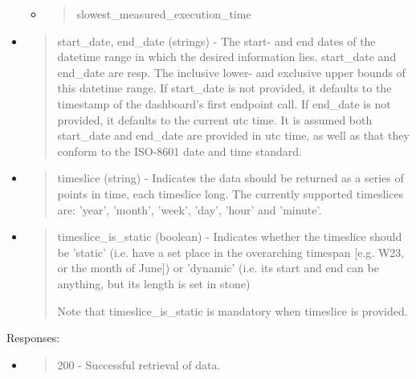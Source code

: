 \begin{itemize}
\begin{itemize}
\begin{quote}
    \end{quote}
  \item
    \begin{quote}
    slowest\_measured\_execution\_time
    \end{quote}
  \end{itemize}
\item
  \begin{quote}
  start\_date, end\_date (strings) - The start- and end dates of the
  datetime range in which the desired information lies. start\_date and
  end\_date are resp. The inclusive lower- and exclusive upper bounds of
  this datetime range.
  If start\_date is not provided, it defaults to the timestamp of the
  dashboard's first endpoint call.  
  If end\_date is not provided, it defaults to the current utc time.  
  It is assumed both start\_date and end\_date are provided in utc time,
  as well as that they conform to the ISO-8601 date and time standard.
  \end{quote}
\end{itemize}

\begin{quote}

\end{quote}

\begin{itemize}
\item
  \begin{quote}
  timeslice (string) - Indicates the data should be returned as a series
  of points in time, each timeslice long.
  The currently supported timeslices are: 'year', 'month', 'week', 'day',
  'hour' and 'minute'.
  \end{quote}
\end{itemize}


\begin{itemize}
\item
  \begin{quote}
  timeslice\_is\_static (boolean) - Indicates whether the timeslice
  should be 'static' (i.e. have a set place in the overarching timespan
  {[}e.g. W23, or the month of June{]}) or 'dynamic' (i.e. its start and
  end can be anything, but its length is set in stone)
  
  Note that timeslice\_is\_static is {mandatory} when timeslice is
  provided.
  \end{quote}
\end{itemize}


Responses:

\begin{itemize}
\item
  \begin{quote}
  200 - Successful retrieval of data.
  \end{quote}
\end{itemize}

